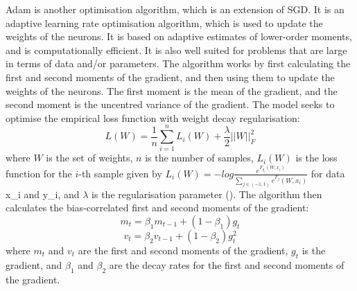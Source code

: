 \documentclass[12pt]{report}
\begin{document}
Adam is another optimisation algorithm, which is an extension of SGD. It is an adaptive learning rate optimisation algorithm, which is used to update the weights of the neurons. It is based on adaptive estimates of lower-order moments, and is computationally efficient. It is also well suited for problems that are large in terms of data and/or parameters. The algorithm works by first calculating the first and second moments of the gradient, and then using them to update the weights of the neurons. The first moment is the mean of the gradient, and the second moment is the uncentred variance of the gradient. The model seeks to optimise the empirical loss function with weight decay regularisation:
\begin{equation}
	L(W) = \frac{1}{n}\sum_{i=1}^{n}L_i(W)+\frac{\lambda}{2}||W||_F^2
\end{equation}
where $W$ is the set of weights, $n$ is the number of samples, $L_i(W)$ is the loss function for the $i$-th sample given by $L_i(W)=-log\frac{e^{F_{y_i}(W,x_i)}}{\sum_{j\in(-1,1)}e^{F_j}(W,x_i)}$ for data x\_i and y\_i, and $\lambda$ is the regularisation parameter (\cite{zou2021}). The algorithm then calculates the bias-correlated first and second moments of the gradient:
\begin{equation}
	m_t = \beta_1 m_{t-1} + (1-\beta_1)g_t
\end{equation}
\begin{equation}
	v_t = \beta_2 v_{t-1} + (1-\beta_2)g_t^2
\end{equation}
where $m_t$ and $v_t$ are the first and second moments of the gradient, $g_t$ is the gradient, and $\beta_1$ and $\beta_2$ are the decay rates for the first and second moments of the gradient.
\end{document}
